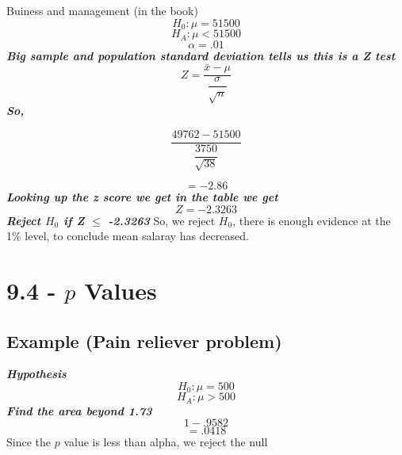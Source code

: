 \documentclass{report}
\begin{document}
\pagebreak
\noindent 
\q
Buiness and management (in the book)
\bigbreak \noindent 
$$ H_0 : \mu = 51500$$
$$ H_A : \mu < 51500$$
$$ \alpha = .01$$
\textit{\textbf{Big sample and population standard deviation tells us this is a Z test}}
$$ Z = \dfrac{\bar{x} - \mu}{\dfrac{\sigma}{\sqrt{n}}}$$
\textit{\textbf{So,}}

$$ \dfrac{49762 - 51500}{\dfrac{3750}{\sqrt{38}}}$$

$$ = -2.86$$
\textit{\textbf{Looking up the z score we get in the table we get}}
$$ Z = -2.3263$$
\textit{\textbf{Reject $H_0$ if Z $\le$ -2.3263}}
So, we reject $H_0$, there is enough evidence at the 1\% level, to conclude mean salaray has decreased.
\section*{9.4 - $p$ Values}
\subsection*{Example (Pain reliever problem)}
\textit{\textbf{Hypothesis}}
$$ H_0 : \mu = 500$$
$$ H_A : \mu >500$$
\textit{\textbf{Find the area beyond 1.73}}
$$ 1 - .9582$$
$$ = .0418$$
Since the $p$ value is less than alpha, we reject the null
\end{document}
